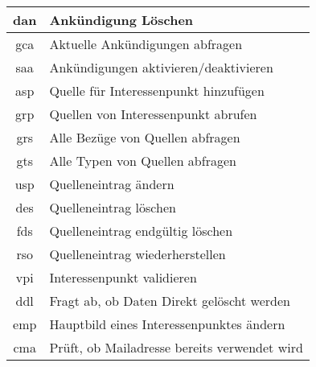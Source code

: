 \begin{longtable}[H]{|c|p{12cm}|}
		dan                 & Ankündigung Löschen                                                                                                                                \\ \hline
		gca                 & Aktuelle Ankündigungen abfragen                                                                                                                    \\ \hline
		saa                 & Ankündigungen aktivieren/deaktivieren                                                                                                              \\ \hline
		asp                 & Quelle für Interessenpunkt hinzufügen                                                                                                              \\ \hline
		grp                 & Quellen von Interessenpunkt abrufen                                                                                                                \\ \hline
		grs                 & Alle Bezüge von Quellen abfragen                                                                                                                   \\ \hline
		gts                 & Alle Typen von Quellen abfragen                                                                                                                    \\ \hline
		usp                 & Quelleneintrag ändern                                                                                                                              \\ \hline
		des                 & Quelleneintrag löschen                                                                                                                             \\ \hline
		fds                 & Quelleneintrag endgültig löschen                                                                                                                   \\ \hline
		rso                 & Quelleneintrag wiederherstellen                                                                                                                    \\ \hline
		vpi                 & Interessenpunkt validieren                                                                                                                         \\ \hline
		ddl                 & Fragt ab, ob Daten Direkt gelöscht werden                                                                                                          \\ \hline
		emp					& Hauptbild eines Interessenpunktes ändern					                                                                                         \\ \hline
		cma					& Prüft, ob Mailadresse bereits verwendet wird				                                                                                         \\ \hline
\end{longtable}
\newpage
